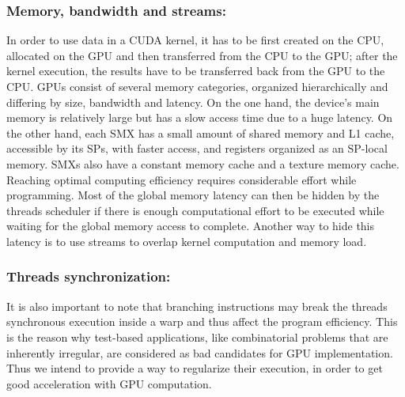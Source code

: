 \subsubsection{Memory, bandwidth and streams:}

In order to use data in a CUDA kernel, it has to be first created on the CPU, allocated on the GPU and then transferred from the CPU to the GPU; after the kernel execution, the results have to be transferred back from the GPU to the CPU. 
GPUs consist of several memory categories, organized hierarchically and differing by size, bandwidth and latency.   
On the one hand, the device's main memory is relatively large but has a slow access time due to a huge latency. 
On the other hand, each SMX has a small amount of shared memory and L1 cache, accessible by its SPs, with faster access, and registers organized as an SP-local memory. 
SMXs also have a constant memory cache and a texture memory cache.
Reaching optimal computing efficiency requires considerable effort while programming.
Most of the global memory latency can then be hidden by the threads scheduler if there is enough computational effort to be executed while waiting for the global memory access to complete. Another way to hide this latency is to use streams to overlap kernel computation and memory load. 

\subsubsection{Threads synchronization:}
It is also important to note that branching instructions may break the threads synchronous execution inside a warp and thus affect the program efficiency. 
This is the reason why test-based applications, like combinatorial problems that are inherently irregular, are considered as bad candidates for GPU implementation. 
Thus we intend to provide a way to regularize their execution, in order to get good acceleration with GPU computation. 

